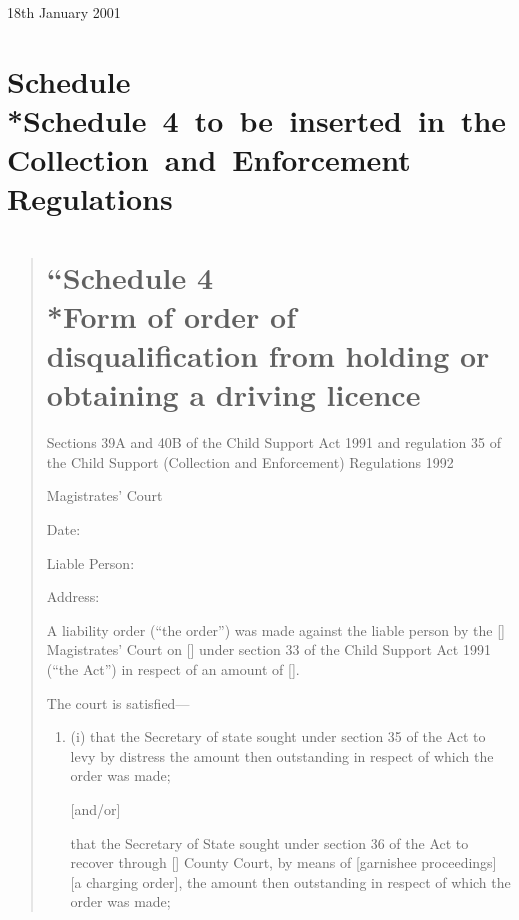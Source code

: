 \documentclass[12pt,a4paper]{article}
\begin{document}
18th January 2001

\small

\part[Schedule --- Schedule 4 to be inserted in the Collection and Enforcement Regulations]{Schedule\\*Schedule~4~to~be~inserted~in~the Collection~and~Enforcement Regulations}

\renewcommand\parthead{--- Schedule}

\begin{quotation}
\noindent
\part*{``Schedule 4\\*Form of order of disqualification from holding or obtaining a driving licence}

\noindent
Sections 39A and 40B of the Child Support Act 1991 and regulation 35 of the Child Support (Collection and Enforcement) Regulations 1992

\medskip

{\raggedleft \hspace{0.5\linewidth}\dotfill Magistrates' Court

}

\medskip

Date:

\medskip

Liable Person:

\medskip

Address:

\medskip

A liability order (``the order'') was made against the liable person by the [\phantom{Bolton}] Magistrates' Court on [\phantom{\today}] under section 33 of the Child Support Act 1991 (``the Act'') in respect of an amount of [\phantom{£100.00}].

The court is satisfied---
\begin{enumerate}
\item[]
(i) that the Secretary of state sought under section 35 of the Act to levy by distress the amount then outstanding in respect of which the order was made;

[and/or]

that the Secretary of State sought under section 36 of the Act to recover through [\phantom{Bolton}] County Court, by means of [garnishee proceedings] [a charging order], the amount then outstanding in respect of which the order was made;


\end{enumerate}
\end{quotation}
\end{document}
